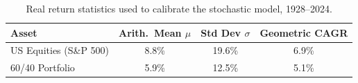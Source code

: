 \documentclass[11pt,letterpaper]{article}
\begin{document}
\begin{table}[H]
\centering
\small
\begin{tabular}{lccc}
\toprule
\textbf{Asset} & \textbf{Arith.\ Mean $\mu$} & \textbf{Std Dev $\sigma$} & \textbf{Geometric CAGR} \\
\midrule
US Equities (S\&P 500) & 8.8\% & 19.6\% & 6.9\% \\
60/40 Portfolio        & 5.9\% & 12.5\% & 5.1\% \\
\bottomrule
\end{tabular}
\caption{Real return statistics used to calibrate the stochastic model, 1928--2024.}
\end{table}
\end{document}
